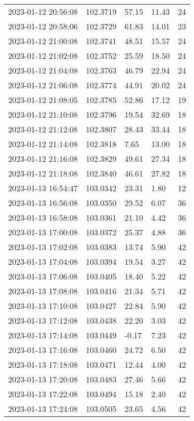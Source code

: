 \documentclass{nature_plusfigure}
\begin{document}
\begin{supplement}
\begin{center}
\begin{longtable}{lllll}
2023-01-12 20:56:08 & 102.3719 & 57.15 & 11.43 & 24 \\ 
2023-01-12 20:58:06 & 102.3729 & 61.83 & 14.01 & 23 \\ 
2023-01-12 21:00:08 & 102.3741 & 48.51 & 15.57 & 24 \\ 
2023-01-12 21:02:08 & 102.3752 & 25.59 & 18.50 & 24 \\ 
2023-01-12 21:04:08 & 102.3763 & 46.79 & 22.94 & 24 \\ 
2023-01-12 21:06:08 & 102.3774 & 44.91 & 20.02 & 24 \\ 
2023-01-12 21:08:05 & 102.3785 & 52.86 & 17.12 & 19 \\ 
2023-01-12 21:10:08 & 102.3796 & 19.54 & 32.69 & 18 \\ 
2023-01-12 21:12:08 & 102.3807 & 28.43 & 33.44 & 18 \\ 
2023-01-12 21:14:08 & 102.3818 & 7.65 & 13.00 & 18 \\ 
2023-01-12 21:16:08 & 102.3829 & 49.61 & 27.34 & 18 \\ 
2023-01-12 21:18:08 & 102.3840 & 46.61 & 27.82 & 18 \\ 
2023-01-13 16:54:47 & 103.0342 & 23.31 & 1.80 & 12 \\ 
2023-01-13 16:56:08 & 103.0350 & 29.52 & 6.07 & 36 \\ 
2023-01-13 16:58:08 & 103.0361 & 21.10 & 4.42 & 36 \\ 
2023-01-13 17:00:08 & 103.0372 & 25.37 & 4.88 & 36 \\ 
2023-01-13 17:02:08 & 103.0383 & 13.74 & 5.90 & 42 \\ 
2023-01-13 17:04:08 & 103.0394 & 19.54 & 3.27 & 42 \\ 
2023-01-13 17:06:08 & 103.0405 & 18.40 & 5.22 & 42 \\ 
2023-01-13 17:08:08 & 103.0416 & 21.34 & 5.71 & 42 \\ 
2023-01-13 17:10:08 & 103.0427 & 22.84 & 5.90 & 42 \\ 
2023-01-13 17:12:08 & 103.0438 & 22.20 & 3.03 & 42 \\ 
2023-01-13 17:14:08 & 103.0449 & -0.17 & 7.23 & 42 \\ 
2023-01-13 17:16:08 & 103.0460 & 24.72 & 6.50 & 42 \\ 
2023-01-13 17:18:08 & 103.0471 & 12.44 & 4.00 & 42 \\ 
2023-01-13 17:20:08 & 103.0483 & 27.46 & 5.66 & 42 \\ 
2023-01-13 17:22:08 & 103.0494 & 15.18 & 2.40 & 42 \\ 
2023-01-13 17:24:08 & 103.0505 & 23.65 & 4.56 & 42 \\ 

\end{longtable}
\end{center}
\end{supplement}
\end{document}
